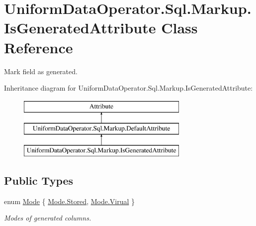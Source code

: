 \hypertarget{class_uniform_data_operator_1_1_sql_1_1_markup_1_1_is_generated_attribute}{}\section{Uniform\+Data\+Operator.\+Sql.\+Markup.\+Is\+Generated\+Attribute Class Reference}
\label{class_uniform_data_operator_1_1_sql_1_1_markup_1_1_is_generated_attribute}


Mark field as generated.  


Inheritance diagram for Uniform\+Data\+Operator.\+Sql.\+Markup.\+Is\+Generated\+Attribute\+:\begin{figure}[H]
\begin{center}
\leavevmode
\includegraphics[height=3.000000cm]{db/d72/class_uniform_data_operator_1_1_sql_1_1_markup_1_1_is_generated_attribute}
\end{center}
\end{figure}
\subsection*{Public Types}
\begin{DoxyCompactItemize}
\item 
enum \mbox{\hyperlink{class_uniform_data_operator_1_1_sql_1_1_markup_1_1_is_generated_attribute_a03e5e76ff63dbcf2cca5746e3098b23d}{Mode}} \{ \mbox{\hyperlink{class_uniform_data_operator_1_1_sql_1_1_markup_1_1_is_generated_attribute_a03e5e76ff63dbcf2cca5746e3098b23da7bf2d26eab899c413218b729d4d914b7}{Mode.\+Stored}}, 
\mbox{\hyperlink{class_uniform_data_operator_1_1_sql_1_1_markup_1_1_is_generated_attribute_a03e5e76ff63dbcf2cca5746e3098b23daa6d194ab7efe0417c28a02b8a8997bd0}{Mode.\+Virual}}
 \}
\begin{DoxyCompactList}\small\item\em Modes of generated columns. \end{DoxyCompactList}\end{DoxyCompactItemize}

